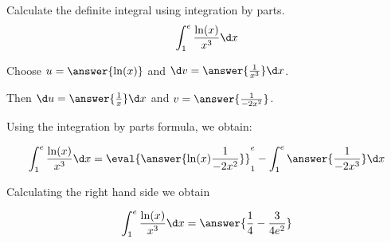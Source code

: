 \documentclass{ximera}
\author{Jason Miller}
\begin{document}
\begin{exercise}
Calculate the definite integral using integration by parts.
\[
\int_{1}^{e} \frac{ \ln(x)}{x^{3}} \d x
\]


Choose $u=\answer{ \ln(x) }$ and $\d v=\answer{\frac{1}{x^{3}}}\d x$. 

Then $\d u= \answer{ \frac{1}{x} } \d x$ and $v= \answer{\frac{1}{-2x^{2}}}$.

Using the integration by parts formula, we obtain:

\[
\int_{1}^{e} \frac{ \ln(x)}{x^{3}} \d x= \eval{\answer{  \ln(x) \frac{1}{-2x^{2}}}}_1^e - \int_{1}^{e} \answer{ \frac{1}{-2x^{3}}}  \d x
\]

Calculating the right hand side we obtain

\[
\int_{1}^{e} \frac{ \ln(x)}{x^{3}} \d x= \answer{\frac{1}{4} - \frac{3}{4e^{2}} }
\]


\end{exercise}
\end{document}
